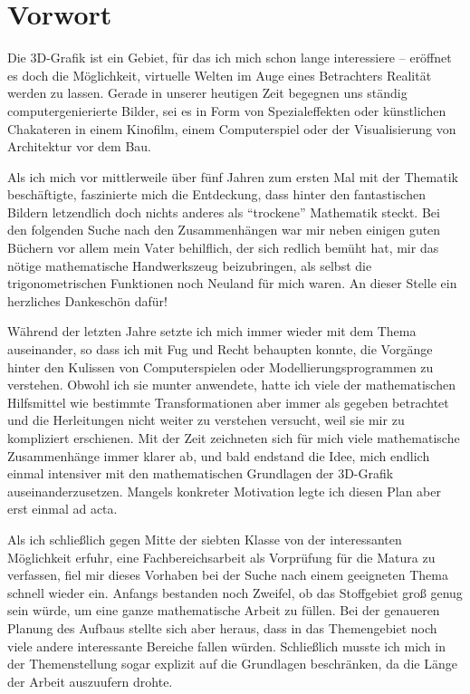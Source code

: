 \chapter{Vorwort}

Die 3D-Grafik ist ein Gebiet, für das ich mich schon lange interessiere -- eröffnet es doch die Möglichkeit, virtuelle Welten im Auge eines Betrachters Realität werden zu lassen. Gerade in unserer heutigen Zeit begegnen uns ständig computergenierierte Bilder, sei es in Form von Spezialeffekten oder künstlichen Chakateren in einem Kinofilm, einem Computerspiel oder der Visualisierung von Architektur vor dem Bau.

Als ich mich vor mittlerweile über fünf Jahren zum ersten Mal mit der Thematik beschäftigte, faszinierte mich die Entdeckung, dass hinter den fantastischen Bildern letzendlich doch nichts anderes als \enquote{trockene} Mathematik steckt. Bei den folgenden Suche nach den Zusammenhängen war mir neben einigen guten Büchern vor allem mein Vater behilflich, der sich redlich bemüht hat, mir das nötige mathematische Handwerkszeug beizubringen, als selbst die trigonometrischen Funktionen noch Neuland für mich waren. An dieser Stelle ein herzliches Dankeschön dafür!

Während der letzten Jahre setzte ich mich immer wieder mit dem Thema auseinander, so dass ich mit Fug und Recht behaupten konnte, die Vorgänge hinter den Kulissen von Computerspielen oder Modellierungsprogrammen zu verstehen. Obwohl ich sie munter anwendete, hatte ich viele der mathematischen Hilfsmittel wie bestimmte Transformationen aber immer als gegeben betrachtet und die Herleitungen nicht weiter zu verstehen versucht, weil sie mir zu kompliziert erschienen. Mit der Zeit zeichneten sich für mich viele mathematische Zusammenhänge immer klarer ab, und bald endstand die Idee, mich endlich einmal intensiver mit den mathematischen Grundlagen der 3D-Grafik auseinanderzusetzen. Mangels konkreter Motivation legte ich diesen Plan aber erst einmal ad acta.

Als ich schließlich gegen Mitte der siebten Klasse von der interessanten Möglichkeit erfuhr, eine Fachbereichsarbeit als Vorprüfung für die Matura zu verfassen, fiel mir dieses Vorhaben bei der Suche nach einem geeigneten Thema schnell wieder ein. Anfangs bestanden noch Zweifel, ob das Stoffgebiet groß genug sein würde, um eine ganze mathematische Arbeit zu füllen. Bei der genaueren Planung des Aufbaus stellte sich aber heraus, dass in das Themengebiet noch viele andere interessante Bereiche fallen würden. Schließlich musste ich mich in der Themenstellung sogar explizit auf die Grundlagen beschränken, da die Länge der Arbeit auszuufern drohte.

